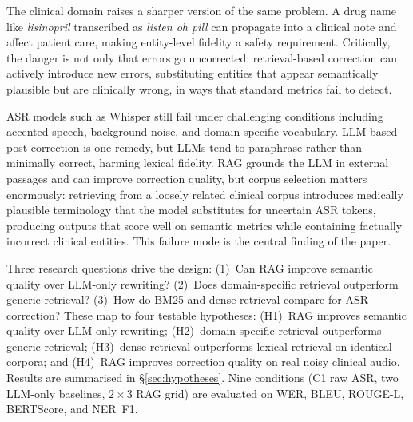\documentclass[11pt,a4paper,twocolumn]{article}
\begin{document}
\medskip

The clinical domain raises a sharper version of the same problem. A drug name 
like \textit{lisinopril} transcribed as \textit{listen oh pill} can propagate 
into a clinical note and affect patient care, making entity-level fidelity a 
safety requirement. Critically, the danger is not only that errors go 
uncorrected: retrieval-based correction can actively introduce new errors, 
substituting entities that appear semantically plausible but are clinically 
wrong, in ways that standard metrics fail to detect.

\medskip

ASR models such as Whisper still fail under challenging conditions including 
accented speech, background noise, and domain-specific vocabulary. LLM-based 
post-correction is one remedy, but LLMs tend to paraphrase rather than minimally 
correct, harming lexical fidelity. RAG grounds the LLM in external passages and 
can improve correction quality, but corpus selection matters enormously: 
retrieving from a loosely related clinical corpus introduces medically plausible 
terminology that the model substitutes for uncertain ASR tokens, producing 
outputs that score well on semantic metrics while containing factually incorrect 
clinical entities. This failure mode is the central finding of the paper.

\medskip

Three research questions drive the design: (1)~Can RAG improve semantic quality 
over LLM-only rewriting? (2)~Does domain-specific retrieval outperform generic 
retrieval? (3)~How do BM25 and dense retrieval compare for ASR correction? These 
map to four testable hypotheses: (H1)~RAG improves semantic quality over 
LLM-only rewriting; (H2)~domain-specific retrieval outperforms generic 
retrieval; (H3)~dense retrieval outperforms lexical retrieval on identical 
corpora; and (H4)~RAG improves correction quality on real noisy clinical audio. 
Results are summarised in \S\ref{sec:hypotheses}. Nine conditions (C1 raw ASR, 
two LLM-only baselines, $2{\times}3$ RAG grid) are evaluated on WER, BLEU, 
ROUGE-L, BERTScore, and NER~F1.
\end{document}
